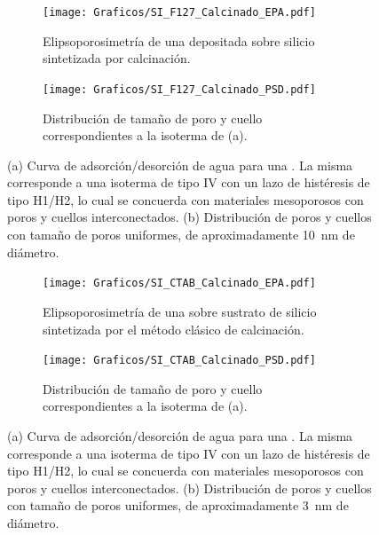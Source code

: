 		     	  	\begin{figure}[!ht]
		     	  		\begin{subfigure}[t]{0.495\textwidth}
		     	  		\texttt{[image: Graficos/SI\_F127\_Calcinado\_EPA.pdf]}
						\caption{Elipsoporosimetría de una \pdmF\space depositada sobre silicio sintetizada por calcinación.}
						\label{fig:F127_EPA}
						\end{subfigure}
						\begin{subfigure}[t]{0.495\textwidth}
		     	  		\texttt{[image: Graficos/SI\_F127\_Calcinado\_PSD.pdf]}
						\caption{Distribución de tamaño de poro y cuello correspondientes a la isoterma de (a).}
						\label{fig:F127_PSD}
						\end{subfigure}
						\caption[Elipsoporosimetría para sistemas \pdmF.]{(a) Curva de adsorción/desorción de agua para una \pdmF\space. La misma corresponde a una isoterma de tipo IV con un lazo de histéresis de tipo H1/H2, lo cual se concuerda con materiales mesoporosos con poros y cuellos interconectados. (b) Distribución de poros y cuellos con tamaño de poros uniformes, de aproximadamente \SI{10}{\nm} de diámetro.}
						\end{figure}
					\begin{figure}[!ht]
		     	  		\begin{subfigure}[t]{0.495\textwidth}
		     	  		\texttt{[image: Graficos/SI\_CTAB\_Calcinado\_EPA.pdf]}
						\caption{Elipsoporosimetría de una \pdmF\space sobre sustrato de silicio sintetizada por el método clásico de calcinación.}
						\label{fig:CTAB_EPA}
						\end{subfigure}
						\begin{subfigure}[t]{0.495\textwidth}
		     	  		\texttt{[image: Graficos/SI\_CTAB\_Calcinado\_PSD.pdf]}
						\caption{Distribución de tamaño de poro y cuello correspondientes a la isoterma de (a).}
						\label{fig:CTAB_PSD}
						\end{subfigure}
						\caption[Elipsoporosimetría para sistemas \pdmC.]{(a) Curva de adsorción/desorción de agua para una \pdmC\space . La misma corresponde a una isoterma de tipo IV con un lazo de histéresis de tipo H1/H2, lo cual se concuerda con materiales mesoporosos con poros y cuellos interconectados. (b) Distribución de poros y cuellos con tamaño de poros uniformes, de aproximadamente \SI{3}{\nm} de diámetro.}
						\end{figure}	
		

